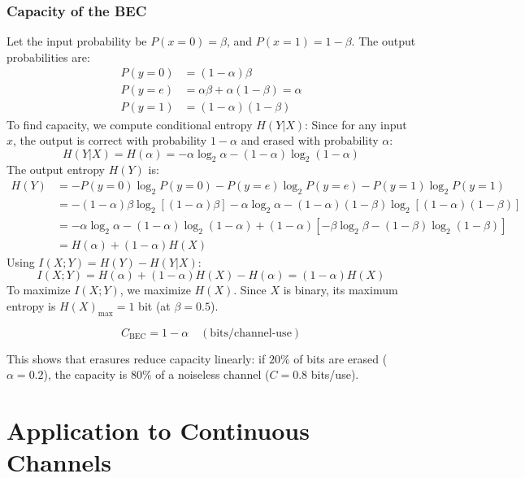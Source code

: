 \documentclass[12pt,a4paper]{article}
\begin{document}
\subsubsection{Capacity of the BEC}
Let the input probability be $P(x=0) = \beta$, and $P(x=1) = 1-\beta$.
The output probabilities are:
\begin{align*}
  P(y=0) &= (1-\alpha)\beta \\
  P(y=e) &= \alpha\beta + \alpha(1-\beta) = \alpha \\
  P(y=1) &= (1-\alpha)(1-\beta)
\end{align*}
To find capacity, we compute conditional entropy $H(Y|X)$:
Since for any input $x$, the output is correct with probability $1-\alpha$ and erased with probability $\alpha$:
\begin{equation*}
  H(Y|X) = H(\alpha) = -\alpha \log_2 \alpha - (1-\alpha)\log_2(1-\alpha)
\end{equation*}
The output entropy $H(Y)$ is:
\begin{align*}
  H(Y) &= -P(y=0)\log_2 P(y=0) - P(y=e)\log_2 P(y=e) - P(y=1)\log_2 P(y=1) \\
  &= -(1-\alpha)\beta \log_2 \left[(1-\alpha)\beta\right] - \alpha\log_2 \alpha - (1-\alpha)(1-\beta)\log_2 \left[(1-\alpha)(1-\beta)\right] \\
  &= -\alpha\log_2 \alpha - (1-\alpha)\log_2(1-\alpha) + (1-\alpha)\left[ -\beta\log_2\beta - (1-\beta)\log_2(1-\beta) \right] \\
  &= H(\alpha) + (1-\alpha) H(X)
\end{align*}
Using $I(X; Y) = H(Y) - H(Y|X)$:
\begin{equation*}
  I(X; Y) = H(\alpha) + (1-\alpha)H(X) - H(\alpha) = (1-\alpha)H(X)
\end{equation*}
To maximize $I(X; Y)$, we maximize $H(X)$. Since $X$ is binary, its maximum entropy is $H(X)_{\text{max}} = 1$ bit (at $\beta = 0.5$).
\begin{tcolorbox}[formulabox, title={\textbf{BEC Channel Capacity}}]
\begin{equation}
  C_{\text{BEC}} = 1 - \alpha \quad (\text{bits/channel-use})
\end{equation}
\end{tcolorbox}
This shows that erasures reduce capacity linearly: if $20\%$ of bits are erased ($\alpha = 0.2$), the capacity is $80\%$ of a noiseless channel ($C = 0.8$ bits/use).

\section{Application to Continuous Channels}
\end{document}
